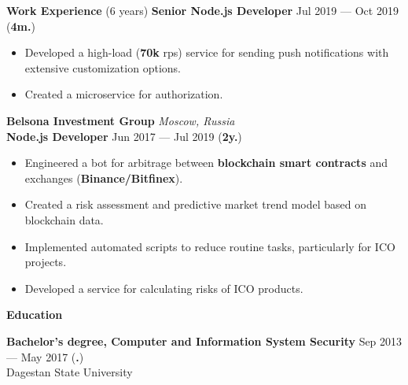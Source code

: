 \documentclass{resume}
\begin{document}
\begin{rSection}{\textbf{Work Experience} (6 years) }
\textbf{Senior Node.js Developer} \hfill Jul 2019 --- Oct 2019 ({\textbf{4m.}})
\begin{itemize}
    \item Developed a high-load (\textbf{70k} rps) service for sending push notifications with extensive customization options\@.
    \item Created a microservice for authorization\@.
\end{itemize}

\textbf{Belsona Investment Group} \hfill \textit{Moscow, Russia} \\
\textbf{Node.js Developer}  \hfill Jun 2017 --- Jul 2019 ({\textbf{2y.}})

\begin{itemize}
    \item Engineered a bot for arbitrage between \textbf{blockchain smart contracts} and exchanges (\textbf{Binance/Bitfinex})\@.
    \item Created a risk assessment and predictive market trend model based on blockchain data\@.
    \item Implemented automated scripts to reduce routine tasks, particularly for ICO projects\@.
    \item Developed a service for calculating risks of ICO products\@.
\end{itemize}

\end{rSection}



\begin{rSection}{\textbf{Education}}

\textbf{Bachelor's degree, Computer and Information System Security} \hfill {Sep 2013 --- May 2017 ({\textbf{.}})} \\
	  Dagestan State University

\end{rSection}
\end{document}
